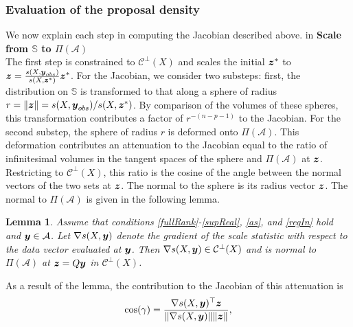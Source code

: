 \documentclass[12pt]{article}
\newcommand{\by}{\mbox{\boldmath $y$}}
\newcommand{\bz}{\mbox{\boldmath $z$}}
\newcommand{\mc}{\mathcal}
\newtheorem{lemma}[theorem]{\bf Lemma}
\begin{document}
\subsubsection{Evaluation of the proposal density} 
We now explain each step in computing the Jacobian described above.
 in
\noindent
{\bf Scale from $\mathbb{S}$ to $\Pi(\mathcal{A})$} \\
The first step is constrained to $\mc{C}^\perp(X)$  and scales the initial $\bz^{*}$ to $\bz=\frac{s(X,\boldsymbol{y}_{obs})}{s(X, \boldsymbol{z}^{*})}\bz^{*}$. For the Jacobian, we consider two substeps: first, the distribution on  $\mathbb{S}$ is transformed to that along a sphere of radius $r=\|\bz\|={s(X,\boldsymbol{y}_{obs})}/{s(X, \boldsymbol{z}^{*})}$. By comparison of the volumes of these spheres, this transformation contributes a factor of $r^{-(n-p-1)}$ to the Jacobian. For the second substep, the sphere of radius $r$ is deformed onto $\Pi(\mathcal{A})$.  This deformation contributes an attenuation to the Jacobian equal to the ratio of infinitesimal volumes in the tangent spaces of the sphere and $\Pi(\mathcal{A})$ at $\bz$.  
Restricting to $\mc{C}^\perp(X)$, this ratio is the cosine of the angle between the normal 
vectors of the two sets at $\bz$.  The normal to the sphere is its radius vector $\bz$. The normal to
$\Pi(\mathcal{A})$ is given in the following lemma.  
\begin{lemma}
\label{gradSTheoremReg}
Assume that conditions \ref{fullRank}-\ref{supReal}, \ref{as}, and \ref{regIn} hold and $\by\in \mathcal{A}$. Let 
$\nabla s(X,\by)$ denote the
gradient of the scale statistic with respect to the data vector evaluated at
$\by$.  Then $\nabla s(X,\by)\in \mc{C}^\perp(X)$ and is 
normal to $\Pi(\mathcal{A})$ at $\bz=Q\by$  in $\mc{C}^\perp(X)$.
\end{lemma}
As a result of the lemma, the contribution to the  Jacobian of this attenuation is 
\begin{equation}
\label{cosine}
\cos(\gamma)=\frac{\nabla s(X,\by)^\top \bz}{\|\nabla
s(X,\by)\| \|\bz\|},
\end{equation}
\end{document}
